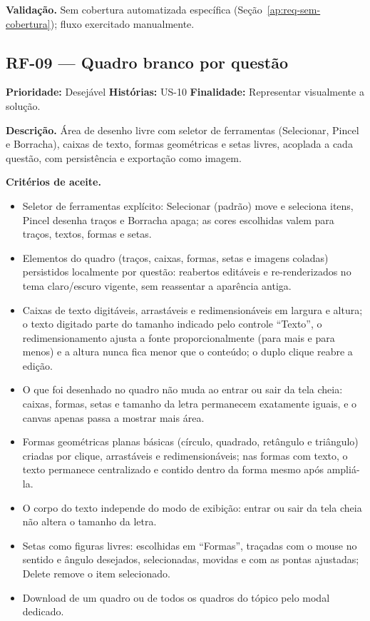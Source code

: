 \textbf{Validação.} Sem cobertura automatizada específica (Seção~\ref{ap:req-sem-cobertura}); fluxo exercitado manualmente.

\subsection{RF-09 --- Quadro branco por questão}

\textbf{Prioridade:} Desejável \quad \textbf{Histórias:} US-10 \quad \textbf{Finalidade:} Representar visualmente a solução.

\textbf{Descrição.} Área de desenho livre com seletor de ferramentas (Selecionar, Pincel e Borracha), caixas de texto, formas geométricas e setas livres, acoplada a cada questão, com persistência e exportação como imagem.

\textbf{Critérios de aceite.}
\begin{itemize}
    \item Seletor de ferramentas explícito: Selecionar (padrão) move e seleciona itens, Pincel desenha traços e Borracha apaga; as cores escolhidas valem para traços, textos, formas e setas.
    \item Elementos do quadro (traços, caixas, formas, setas e imagens coladas) persistidos localmente por questão: reabertos editáveis e re-renderizados no tema claro/escuro vigente, sem reassentar a aparência antiga.
    \item Caixas de texto digitáveis, arrastáveis e redimensionáveis em largura e altura; o texto digitado parte do tamanho indicado pelo controle ``Texto'', o redimensionamento ajusta a fonte proporcionalmente (para mais e para menos) e a altura nunca fica menor que o conteúdo; o duplo clique reabre a edição.
    \item O que foi desenhado no quadro não muda ao entrar ou sair da tela cheia: caixas, formas, setas e tamanho da letra permanecem exatamente iguais, e o canvas apenas passa a mostrar mais área.
    \item Formas geométricas planas básicas (círculo, quadrado, retângulo e triângulo) criadas por clique, arrastáveis e redimensionáveis; nas formas com texto, o texto permanece centralizado e contido dentro da forma mesmo após ampliá-la.
    \item O corpo do texto independe do modo de exibição: entrar ou sair da tela cheia não altera o tamanho da letra.
    \item Setas como figuras livres: escolhidas em ``Formas'', traçadas com o mouse no sentido e ângulo desejados, selecionadas, movidas e com as pontas ajustadas; Delete remove o item selecionado.
    \item Download de um quadro ou de todos os quadros do tópico pelo modal dedicado.
\end{itemize}

